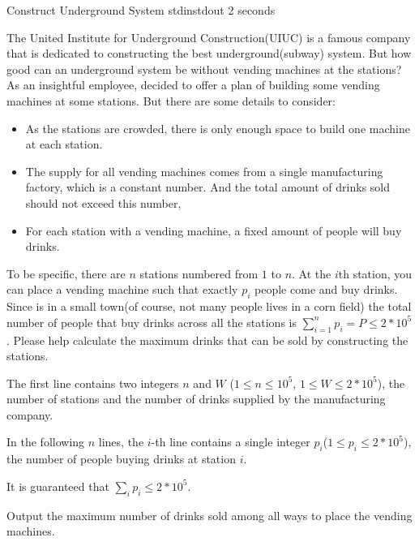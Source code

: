 \begin{problem}{Construct Underground System}
{stdin}{stdout}
{2 seconds}{}{}

The United Institute for Underground Construction(UIUC) is a famous company that is dedicated to constructing the best underground(subway) system. But how good can an underground system be without vending machines at the stations? As an insightful employee, \pittoresque decided to offer a plan of building some vending machines at some stations. But there are some details to consider:
\begin{itemize}
    \item As the stations are crowded, there is only enough space to build one machine at each station.
    \item The supply for all vending machines comes from a single manufacturing factory, which is a constant number. And the total amount of drinks sold should not exceed this number,
    \item For each station with a vending machine, a fixed amount of people will buy drinks. 
\end{itemize}

To be specific, there are $n$ stations numbered from $1$ to $n$. At the $i$th station, you can place a vending machine such that exactly $p_i$ people come and buy drinks. Since \pittoresque is in a small town(of course, not many people lives in a corn field) the total number of people that buy drinks across all the stations is $\sum_{i=1}^n p_i = P \leq 2 * 10^5$. Please help \pittoresque calculate the maximum drinks that can be sold by constructing the stations. 

\InputFile

The first line contains two integers $n$ and $W$ ($1 \le n \le 10^5$, $1 \le W \le 2 * 10^5$), the number of stations and the number of  drinks supplied by the manufacturing company.

In the following $n$ lines, the $i$-th line contains a single integer $p_i$($1 \le p_i \le 2 * 10^5$), the number of people buying drinks at station $i$.

It is guaranteed that $\sum_i p_i \leq 2 * 10^5$.

\OutputFile

Output the maximum number of drinks sold among all ways to place the vending machines.

\Examples

\begin{example}
%
\end{example}

\begin{example}
%
\end{example}



\end{problem}